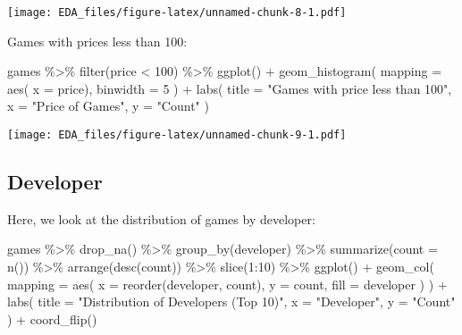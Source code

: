 \documentclass[
]{article}
\newenvironment{Shaded}{\begin{snugshade}}{\end{snugshade}}
\newcommand{\AttributeTok}[1]{\textcolor[rgb]{0.77,0.63,0.00}{#1}}
\newcommand{\DecValTok}[1]{\textcolor[rgb]{0.00,0.00,0.81}{#1}}
\newcommand{\FunctionTok}[1]{\textcolor[rgb]{0.00,0.00,0.00}{#1}}
\newcommand{\NormalTok}[1]{#1}
\newcommand{\SpecialCharTok}[1]{\textcolor[rgb]{0.00,0.00,0.00}{#1}}
\newcommand{\StringTok}[1]{\textcolor[rgb]{0.31,0.60,0.02}{#1}}
\begin{document}
\texttt{[image: EDA\_files/figure-latex/unnamed-chunk-8-1.pdf]}

Games with prices less than 100:

\begin{Shaded}
\begin{Highlighting}[]
\NormalTok{games }\SpecialCharTok{\%\textgreater{}\%}
  \FunctionTok{filter}\NormalTok{(price }\SpecialCharTok{\textless{}} \DecValTok{100}\NormalTok{) }\SpecialCharTok{\%\textgreater{}\%}
  \FunctionTok{ggplot}\NormalTok{() }\SpecialCharTok{+}
  \FunctionTok{geom\_histogram}\NormalTok{(}
    \AttributeTok{mapping =} \FunctionTok{aes}\NormalTok{(}
      \AttributeTok{x =}\NormalTok{ price),}
    \AttributeTok{binwidth =} \DecValTok{5}
\NormalTok{  ) }\SpecialCharTok{+}
    \FunctionTok{labs}\NormalTok{(}
    \AttributeTok{title =} \StringTok{"Games with price less than 100"}\NormalTok{,}
    \AttributeTok{x =} \StringTok{"Price of Games"}\NormalTok{,}
    \AttributeTok{y =} \StringTok{"Count"}
\NormalTok{  )}
\end{Highlighting}
\end{Shaded}

\texttt{[image: EDA\_files/figure-latex/unnamed-chunk-9-1.pdf]}

\hypertarget{developer}{%
\subsection{Developer}\label{developer}}

Here, we look at the distribution of games by developer:

\begin{Shaded}
\begin{Highlighting}[]
\NormalTok{games }\SpecialCharTok{\%\textgreater{}\%}
  \FunctionTok{drop\_na}\NormalTok{() }\SpecialCharTok{\%\textgreater{}\%}
  \FunctionTok{group\_by}\NormalTok{(developer) }\SpecialCharTok{\%\textgreater{}\%}
  \FunctionTok{summarize}\NormalTok{(}\AttributeTok{count =} \FunctionTok{n}\NormalTok{()) }\SpecialCharTok{\%\textgreater{}\%}
  \FunctionTok{arrange}\NormalTok{(}\FunctionTok{desc}\NormalTok{(count)) }\SpecialCharTok{\%\textgreater{}\%}
  \FunctionTok{slice}\NormalTok{(}\DecValTok{1}\SpecialCharTok{:}\DecValTok{10}\NormalTok{) }\SpecialCharTok{\%\textgreater{}\%}
  \FunctionTok{ggplot}\NormalTok{() }\SpecialCharTok{+}
  \FunctionTok{geom\_col}\NormalTok{(}
    \AttributeTok{mapping =} \FunctionTok{aes}\NormalTok{(}
      \AttributeTok{x =} \FunctionTok{reorder}\NormalTok{(developer, count),}
      \AttributeTok{y =}\NormalTok{ count,}
      \AttributeTok{fill =}\NormalTok{ developer}
\NormalTok{    )}
\NormalTok{  ) }\SpecialCharTok{+}
  \FunctionTok{labs}\NormalTok{(}
    \AttributeTok{title =} \StringTok{"Distribution of Developers (Top 10)"}\NormalTok{,}
    \AttributeTok{x =} \StringTok{"Developer"}\NormalTok{,}
    \AttributeTok{y =} \StringTok{"Count"}
\NormalTok{  ) }\SpecialCharTok{+}
  \FunctionTok{coord\_flip}\NormalTok{()}
\end{Highlighting}
\end{Shaded}
\end{document}
